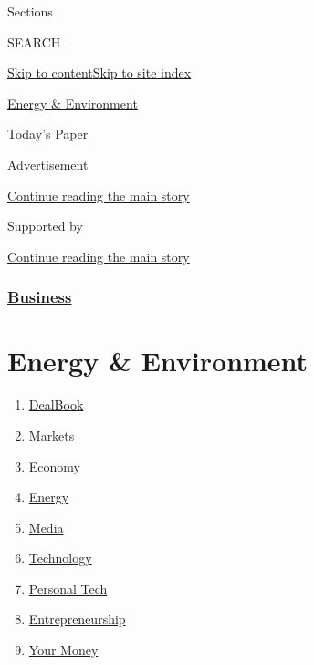 Sections

SEARCH

\protect\hyperlink{site-content}{Skip to
content}\protect\hyperlink{site-index}{Skip to site index}

\href{https://www.nytimes3xbfgragh.onion/section/business/energy-environment}{Energy
\& Environment}

\href{https://myaccount.nytimes3xbfgragh.onion/auth/login?response_type=cookie\&client_id=vi}{}

\href{https://www.nytimes3xbfgragh.onion/section/todayspaper}{Today's
Paper}

Advertisement

\protect\hyperlink{after-top}{Continue reading the main story}

Supported by

\protect\hyperlink{after-sponsor}{Continue reading the main story}

\hypertarget{business}{%
\subsubsection{\texorpdfstring{\href{/section/business}{Business}}{Business}}\label{business}}

\hypertarget{energy--environment}{%
\section{Energy \& Environment}\label{energy--environment}}

\begin{enumerate}
\def\labelenumi{\arabic{enumi}.}
\tightlist
\item
  \href{/pages/business/dealbook/index.html}{DealBook}
\item
  \href{https://markets.on.nytimes3xbfgragh.onion}{Markets}
\item
  \href{/section/business/economy}{Economy}
\item
  \href{/section/business/energy-environment}{Energy}
\item
  \href{/section/business/media}{Media}
\item
  \href{/section/technology}{Technology}
\item
  \href{/section/technology/personaltech}{Personal Tech}
\item
  \href{/section/business/smallbusiness}{Entrepreneurship}
\item
  \href{/section/your-money}{Your Money}
\end{enumerate}

